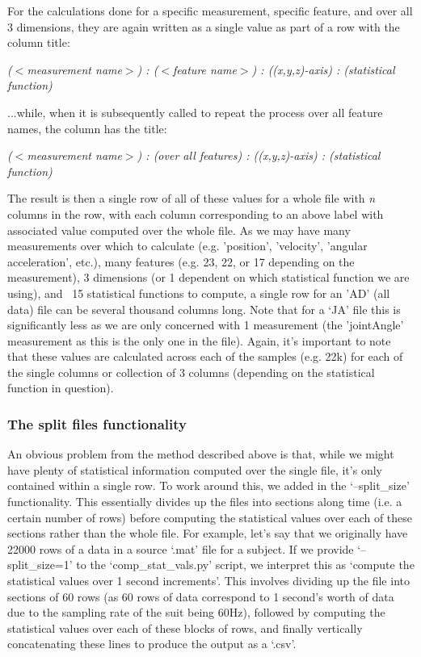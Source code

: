\documentclass[12pt,twoside]{report}
\begin{document}
\quad For the calculations done for a specific measurement, specific feature, and over all 3 dimensions, they are again written as a single value as part of a row with the column title:
\begin{center}
\textit{($<$measurement name$>$) : ($<$feature name$>$) : ((\textit{x},\textit{y},\textit{z})-axis) : (statistical function)}\\
\end{center}

...while, when it is subsequently called to repeat the process over all feature names, the column has the title:
\begin{center}
\textit{($<$measurement name$>$) : (over all features) : ((\textit{x},\textit{y},\textit{z})-axis) : (statistical function)}\\
\end{center}

\quad The result is then a single row of all of these values for a whole file with \textit{n} columns in the row, with each column corresponding to an above label with associated value computed over the whole file. As we may have many measurements over which to calculate (e.g. 'position', 'velocity', 'angular acceleration', etc.), many features (e.g. 23, 22, or 17 depending on the measurement), 3 dimensions (or 1 dependent on which statistical function we are using), and ~15 statistical functions to compute, a single row for an 'AD' (all data) file can be several thousand columns long. Note that for a ‘JA’ file this is significantly less as we are only concerned with 1 measurement (the 'jointAngle' measurement as this is the only one in the file). Again, it’s important to note that these values are calculated across each of the samples (e.g. 22k) for each of the single columns or collection of 3 columns (depending on the statistical function in question).

\subsubsection{The split files functionality}

\quad An obvious problem from the method described above is that, while we might have plenty of statistical information computed over the single file, it’s only contained within a single row. To work around this, we added in the ‘--split\_size’ functionality. This essentially divides up the files into sections along time (i.e. a certain number of rows) before computing the statistical values over each of these sections rather than the whole file. For example, let’s say that we originally have 22000 rows of a data in a source ‘.mat’ file for a subject. If we provide ‘--split\_size=1’ to the ‘comp\_stat\_vals.py’ script, we interpret this as ‘compute the statistical values over 1 second increments’. This involves dividing up the file into sections of 60 rows (as 60 rows of data correspond to 1 second’s worth of data due to the sampling rate of the suit being 60Hz), followed by computing the statistical values over each of these blocks of rows, and finally vertically concatenating these lines to produce the output as a ‘.csv’.\\
\end{document}
